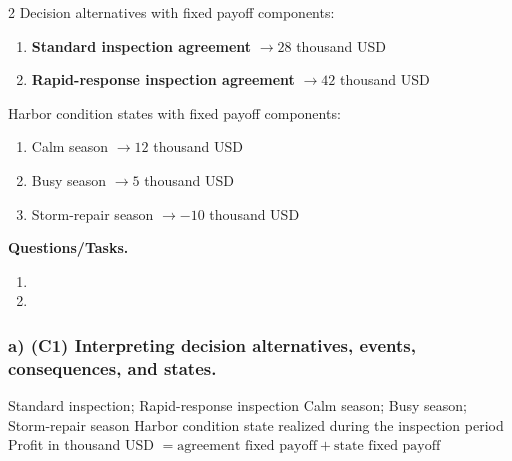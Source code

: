 	\begin{multicols}{2}
		Decision alternatives with fixed payoff components:
		\begin{enumerate}[label=\arabic*.]
			\item \textbf{Standard inspection agreement} $\to 28$ thousand USD
			\item \textbf{Rapid-response inspection agreement} $\to 42$ thousand USD
		\end{enumerate}
	
			\columnbreak
	
		Harbor condition states with fixed payoff components:
		\begin{enumerate}[label=\arabic*.]
			\item Calm season $\to 12$ thousand USD
			\item Busy season $\to 5$ thousand USD
			\item Storm-repair season $\to -10$ thousand USD
		\end{enumerate}
	\end{multicols}

	\textbf{Questions/Tasks.}
	\begin{enumerate}[label=\textbf{\alph*)}]
		\item {}
		\item {}
	\end{enumerate}
	
	\subsubsection*{a) \textbf{(C1)} Interpreting decision alternatives, events, consequences, and states.}
	\label{subsec:problem10-harbor-inspection-agreements-c1}
	\DecisionElementsTable
	{Standard inspection; Rapid-response inspection}
	{Calm season; Busy season; Storm-repair season}
	{Harbor condition state realized during the inspection period}
	{Profit in thousand USD $= \text{agreement fixed payoff} + \text{state fixed payoff}$}
	
	
